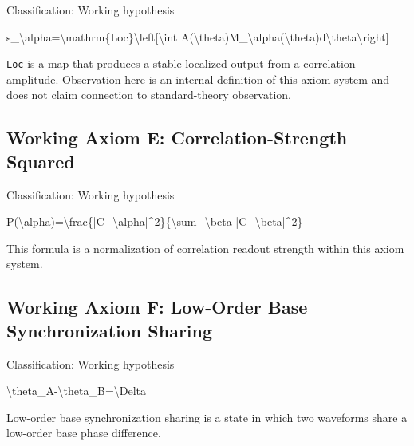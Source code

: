 \documentclass[
  a4paper]{article}
\newenvironment{Shaded}{}{}
\newcommand{\NormalTok}[1]{#1}
\begin{document}
Classification: Working hypothesis

\begin{Shaded}
\begin{Highlighting}[]
\NormalTok{s\_\textbackslash{}alpha=\textbackslash{}mathrm\{Loc\}\textbackslash{}left[\textbackslash{}int A(\textbackslash{}theta)M\_\textbackslash{}alpha(\textbackslash{}theta)d\textbackslash{}theta\textbackslash{}right]}
\end{Highlighting}
\end{Shaded}

\texttt{Loc} is a map that produces a stable localized output from a
correlation amplitude. Observation here is an internal definition of
this axiom system and does not claim connection to standard-theory
observation.

\subsection{Working Axiom E: Correlation-Strength
Squared}\label{working-axiom-e-correlation-strength-squared}

Classification: Working hypothesis

\begin{Shaded}
\begin{Highlighting}[]
\NormalTok{P(\textbackslash{}alpha)=\textbackslash{}frac\{|C\_\textbackslash{}alpha|\^{}2\}\{\textbackslash{}sum\_\textbackslash{}beta |C\_\textbackslash{}beta|\^{}2\}}
\end{Highlighting}
\end{Shaded}

This formula is a normalization of correlation readout strength within
this axiom system.

\subsection{Working Axiom F: Low-Order Base Synchronization
Sharing}\label{working-axiom-f-low-order-base-synchronization-sharing}

Classification: Working hypothesis

\begin{Shaded}
\begin{Highlighting}[]
\NormalTok{\textbackslash{}theta\_A{-}\textbackslash{}theta\_B=\textbackslash{}Delta}
\end{Highlighting}
\end{Shaded}

Low-order base synchronization sharing is a state in which two waveforms
share a low-order base phase difference.
\end{document}
